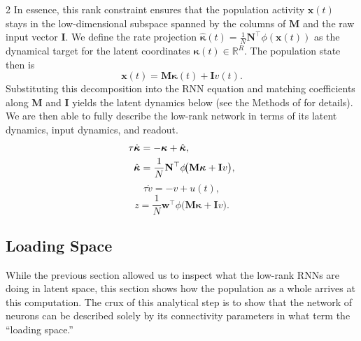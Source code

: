 \documentclass[10pt]{article}
\begin{document}
\begin{multicols}{2}
In essence, this rank constraint ensures that the population activity $\mathbf{x}(t)$ stays in the low-dimensional subspace spanned by the columns of $\mathbf{M}$ and the raw input vector $\mathbf{I}$. We define the rate projection $\hat{\boldsymbol{\kappa}}(t)=\frac{1}{N}\mathbf{N}^{\top}\phi(\mathbf{x}(t))$ as the dynamical target for the latent coordinates $\boldsymbol{\kappa}(t)\in\mathbb{R}^{R}$. The population state then is
\begin{equation}
\mathbf{x}(t)=\mathbf{M}\boldsymbol{\kappa}(t)+\mathbf{I}v(t).
\end{equation}
Substituting this decomposition into the RNN equation and matching coefficients along $\mathbf{M}$ and $\mathbf{I}$ yields the latent dynamics below (see the Methods of \citet{dubreuil2022} for details). We are then able to fully describe the low-rank network in terms of its latent dynamics, input dynamics, and readout.
\begin{align}
\tau\dot{\boldsymbol{\kappa}}
&=-\boldsymbol{\kappa}+\hat{\boldsymbol{\kappa}}, \notag\\
\hat{\boldsymbol{\kappa}}
&=\frac{1}{N}\mathbf{N}^{\top}\phi\!\bigl(
\mathbf{M}\boldsymbol{\kappa}+\mathbf{I}v\bigr),
\end{align}
\begin{equation}
\tau\dot{v}=-v+u(t),
\end{equation}
\begin{equation}
z=\frac{1}{N}\mathbf{w}^{\top}\phi\!\bigl(
\mathbf{M}\boldsymbol{\kappa}+\mathbf{I}v\bigr).
\end{equation}

\subsection{Loading Space}

While the previous section allowed us to inspect what the low-rank RNNs are doing in latent space, this section shows how the population as a whole arrives at this computation. The crux of this analytical step is to show that the network of neurons can be described solely by its connectivity parameters in what \citet{dubreuil2022} term the ``loading space.''


\end{multicols}
\end{document}
